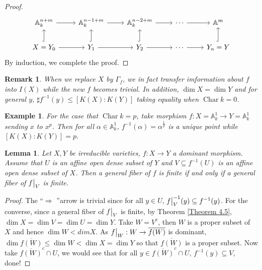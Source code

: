 \documentclass{ctexart}
\newtheorem{remark}{Remark}[section]
\newtheorem{lemma}{Lemma}[section]
\newtheorem{example}{Example}[section]
\newcommand{\leftquotes}{\textquotedblleft}
\newcommand{\rightquotes}{\textquotedblright}
\newcommand{\characteristic}{\operatorname{Char}}
\begin{document}
\begin{proof}
    \begin{equation}
        \begin{tikzcd}
            \mathbb{A}_{k}^{n + m} \arrow[r] &
            \mathbb{A}_{k}^{n - 1 + m} \arrow[r] &
            \mathbb{A}_{k}^{n - 2 + m} \arrow[r] &
            \cdots \arrow[r] &
            \mathbb{A}^{m} \\
            X = Y_{0} \arrow[u, hookrightarrow] \arrow[r] &
            Y_{1} \arrow[u, hookrightarrow] \arrow[r] &
            Y_{2} \arrow[u, hookrightarrow] \arrow[r] &
            \cdots \arrow[r] &
            Y_{n} = Y \arrow[u, hookrightarrow]
        \end{tikzcd}
    \end{equation}
    By induction, we complete the proof.
\end{proof}
\begin{remark}
    When we replace $X$ by $\Gamma_{f}$, we in fact transfer imformation about $f$ into $I(X)$ while the new $f$ becomes trivial.
    In addition, $\dim X = \dim Y$ and for general $y$, $\sharp f^{-1}(y) \le [K(X) : K(Y)]$ taking equality when $\characteristic k = 0$.
\end{remark}
\begin{example}
    For the case that $\characteristic k = p$,
    take morphism $f: X = \mathbb{A}_{k}^{1} \rightarrow Y = \mathbb{A}_{k}^{1}$ sending $x$ to $x^{p}$.
    Then for all $\alpha\in \mathbb{A}_{k}^{1}$, $f^{-1}(\alpha) = \alpha^{\frac{1}{p}}$ is a unique point while $[K(X) : K(Y)] = p$.
\end{example}
\begin{lemma}
    Let $X, Y$ be irreducible varieties, $f: X \rightarrow Y$ a dominant morphism.
    Assume that $U$ is an affine open dense subset of $Y$ and $V \subseteq f^{-1}(U)$ is an affine open dense subset of $X$.
    Then a general fiber of $f$ is finite if and only if a general fiber of $f\big{|}_{V}$ is finite.
    \label{Lemma 4.1}
\end{lemma}
\begin{proof}
    The \leftquotes $\Rightarrow$ \rightquotes arrow is trivial since for all $y\in U$, $f\big{|}_{V}^{-1}(y) \subseteq f^{-1}(y)$.
    For the converse, since a general fiber of $f\big{|}_{V}$ is finite, by Theorem \ref{Theorem 4.5}, $\dim X = \dim V = \dim U = \dim Y$.
    Take $W = V^{c}$, then $W$ is a proper subset of $X$ and hence $\dim W < dim X$.
    As $f\big{|}_{W}: W \rightarrow \overline{f(W)}$ is dominant, $\dim \overline{f(W)} \le \dim W < \dim X = \dim Y$ so that $\overline{f(W)}$ is a proper subset.
    Now take $\overline{f(W)}^{c} \cap U$, we would see that for all $y\in \overline{f(W)}^{c} \cap U$, $f^{-1}(y) \subseteq V$, done!
\end{proof}
\end{document}
